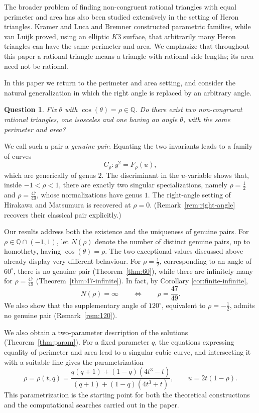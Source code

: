 \documentclass[11pt]{amsart}
\theoremstyle{plain}
\theoremstyle{remark}
\theoremstyle{plain}
\newtheorem*{que}{\textbf{Question}}
\newcommand{\Q}{\mathbb{Q}}
\begin{document}
The broader problem of finding non-congruent rational triangles with equal
perimeter and area has also been studied extensively in the setting of Heron
triangles. Kramer and Luca \cite{KramerLuca} and Bremner \cite{Bremner} constructed
parametric families, while van Luijk \cite{vL07} proved, using an elliptic $K3$
surface, that arbitrarily many Heron triangles can have the same perimeter and
area. We emphasize that throughout this paper a rational triangle means a
triangle with rational side lengths; its area need not be rational.




In this paper we return to the perimeter and area setting, and consider
the natural generalization in which the right angle is replaced by an
arbitrary angle.
\begin{que}
Fix $\theta$ with $\cos(\theta)=\rho\in\Q$. Do there exist two non-congruent rational triangles, one isosceles and one having an angle $\theta$, with the same perimeter and area?
\end{que}
We call such a pair a \emph{genuine pair}.
Equating the two invariants leads to
a family of curves
\[
C_\rho\colon y^2=F_\rho(u),
\]
which are generically of genus $2$. The discriminant in the $u$-variable
shows that, inside $-1<\rho<1$, there are exactly two singular
specializations, namely $\rho=\frac12$ and $\rho=\frac{47}{49}$, whose
normalizations have genus $1$. The right-angle setting of Hirakawa and
Matsumura is recovered at $\rho=0$. (Remark~\ref{rem:right-angle}
recovers their classical pair explicitly.)


Our results address both the existence and the uniqueness of genuine
pairs. For $\rho\in\Q\cap(-1,1)$, let $N(\rho)$ denote the number of
distinct genuine pairs, up to homothety, having
$\cos(\theta)=\rho$. The two exceptional values discussed above already
display very different behaviour. For $\rho=\frac12$, corresponding to
an angle of $60^\circ$, there is no genuine pair (Theorem~\ref{thm:60}), while there are infinitely many for
$\rho=\frac{47}{49}$ (Theorem~\ref{thm:47-infinite}). In fact, by Corollary \ref{cor:finite-infinite},
\[
N(\rho)=\infty
\qquad\Longleftrightarrow\qquad
\rho=\frac{47}{49}.
\]
We also show that the supplementary angle of $120^\circ$, equivalent to $\rho=-\frac12$, admits no
genuine pair (Remark~\ref{rem:120}).


We also obtain a two-parameter description of the solutions (Theorem~\ref{thm:param}). For a
fixed parameter $q$, the equations expressing equality of perimeter
and area lead to a singular cubic curve, and intersecting it with a suitable
line gives the parametrization
\[
\rho=\rho(t,q)
=
\frac{q(q+1)+(1-q)(4t^3-t)}
     {(q+1)+(1-q)(4t^3+t)},
\qquad
u=2t(1-\rho).
\]
This parametrization is the starting point for both the theoretical
constructions and the computational searches carried out in the paper.
\end{document}
